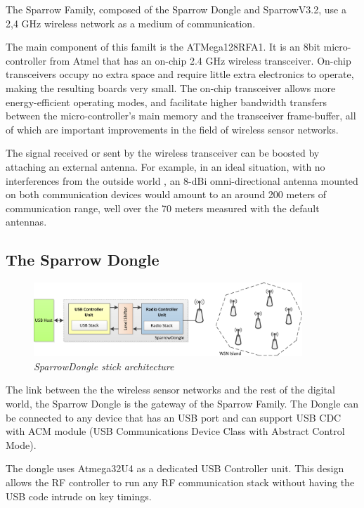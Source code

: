 The Sparrow Family, composed of the Sparrow Dongle and SparrowV3.2, use a 2,4 GHz wireless network as a medium of communication. 

The main component of this familt is the ATMega128RFA1. It is an 8bit micro-controller from Atmel that has an on-chip 2.4 GHz wireless transceiver. On-chip transceivers occupy no extra space and require little extra electronics to operate, making the resulting boards very small. The on-chip transceiver allows more energy-efficient operating modes, and facilitate higher bandwidth transfers between the micro-controller's main memory and the transceiver frame-buffer, all
of which are important improvements in the field of wireless sensor networks. 

The signal received or sent by the wireless transceiver can be boosted by attaching an external antenna. For example, in an ideal situation, with no interferences from the outside world , an 8-dBi omni-directional antenna mounted on both communication devices would amount to an around 200 meters of communication range, well over the 70 meters measured with the default antennas.

\subsection{The Sparrow Dongle}

\begin{figure}[ht]
\begin{center}
\includegraphics[width=0.9\textwidth]{hw_platform/donge_architecture.png}
\end{center}
\caption{\small \itshape{SparrowDongle stick architecture}}
\end{figure}

The link between the the wireless sensor networks and the rest of the digital world, the Sparrow Dongle is the gateway of the Sparrow Family. The Dongle can be connected to any device that has an USB port and can support USB CDC with ACM module (USB Communications Device Class with Abstract Control Mode). 

The dongle uses Atmega32U4 as a dedicated USB Controller unit. This design allows the RF controller to run any RF communication stack without having the USB code intrude on key timings.\cite{voinescu2013lightweight}


